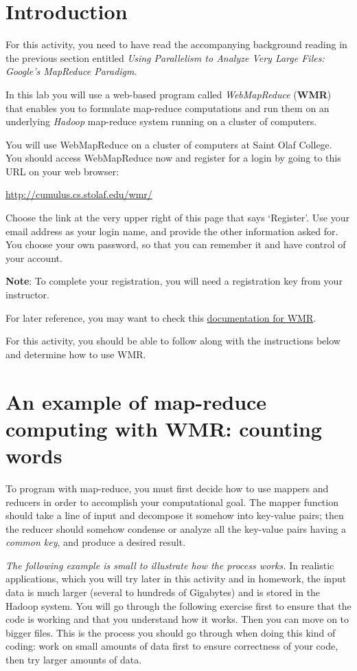 \documentclass[letterpaper,10pt,openany,oneside]{sphinxmanual}
\begin{document}
\section{Introduction}
\label{wmr_basic/wmr_multi_language:introduction}
For this activity, you need to have read the accompanying
background reading in the previous section entitled
\emph{Using Parallelism to Analyze Very Large Files: Google's MapReduce Paradigm}.

In this lab you will use a web-based program called \emph{WebMapReduce}
(\textbf{WMR}) that enables you to formulate map-reduce computations and
run them on an underlying \emph{Hadoop} map-reduce system running on a
cluster of computers.

You will use WebMapReduce on a cluster of computers at Saint Olaf
College. You should access WebMapReduce now and register for a
login by going to this URL on your web browser:

\href{http://cumulus.cs.stolaf.edu/wmr/}{http://cumulus.cs.stolaf.edu/wmr/}

Choose the link at the very upper right of this page that says
`Register'. Use your email address as your login name,
and provide the other information asked for. You choose your own
password, so that you can remember it and have control of your
account.

\textbf{Note}: To complete your registration, you will need a registration
key from your instructor.

For later reference, you may want to check this \href{http://webmapreduce.sourceforge.net/docs/using/index.html}{documentation for
WMR}.

For this activity, you should be able to follow along with the
instructions below and determine how to use WMR.


\section{An example of map-reduce computing with WMR: counting words}
\label{wmr_basic/wmr_multi_language:an-example-of-map-reduce-computing-with-wmr-counting-words}
To program with map-reduce, you must first decide how to use
mappers and reducers in order to accomplish your computational
goal. The mapper function should take a line of input and decompose
it somehow into key-value pairs; then the reducer should somehow
condense or analyze all the key-value pairs having a \emph{common key},
and produce a desired result.

\emph{The following example is small to illustrate how the process works.}
In realistic applications, which you will try later in this
activity and in homework, the input data is much larger (several to
hundreds of Gigabytes) and is stored in the Hadoop system. You will
go through the following exercise first to ensure that the code is
working and that you understand how it works. Then you can move on
to bigger files. This is the process you should go through when
doing this kind of coding: work on small amounts of data first to
ensure correctness of your code, then try larger amounts of data.
\end{document}
